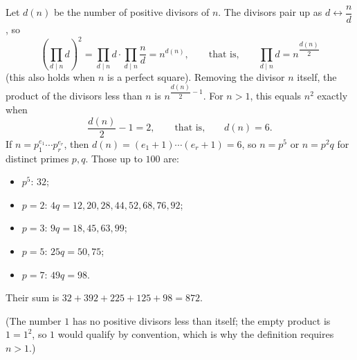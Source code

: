 Let $d(n)$ be the number of positive divisors of $n$. The divisors pair up as $d\leftrightarrow\dfrac {n}{d}$, so
\[\left(\prod_{d\mid n}d\right)^2=\prod_{d\mid n}d\cdot\prod_{d\mid n}\dfrac {n}{d}=n^{d(n)},\qquad\text{that is,}\qquad \prod_{d\mid n}d=n^{\dfrac{d(n)}{2}}\]
(this also holds when $n$ is a perfect square). Removing the divisor $n$ itself, the product of the divisors less than $n$ is $n^{\dfrac{d(n)}{2}-1}$. For $n>1$, this equals $n^2$ exactly when
\[\dfrac{d(n)}{2}-1=2,\qquad\text{that is,}\qquad d(n)=6 .\]
If $n=p_1^{e_1}\cdots p_r^{e_r}$, then $d(n)=(e_1+1)\cdots(e_r+1)=6$, so $n=p^5$ or $n=p^2q$ for distinct primes $p,q$. Those up to $100$ are:
\begin{itemize}
\item $p^5$: $32$;
\item $p=2$: $4q=12,20,28,44,52,68,76,92$;
\item $p=3$: $9q=18,45,63,99$;
\item $p=5$: $25q=50,75$;
\item $p=7$: $49q=98$.
\end{itemize}
Their sum is $32+392+225+125+98=\boxed{872}$.

(The number $1$ has no positive divisors less than itself; the empty product is $1=1^2$, so $1$ would qualify by convention, which is why the definition requires $n>1$.)

